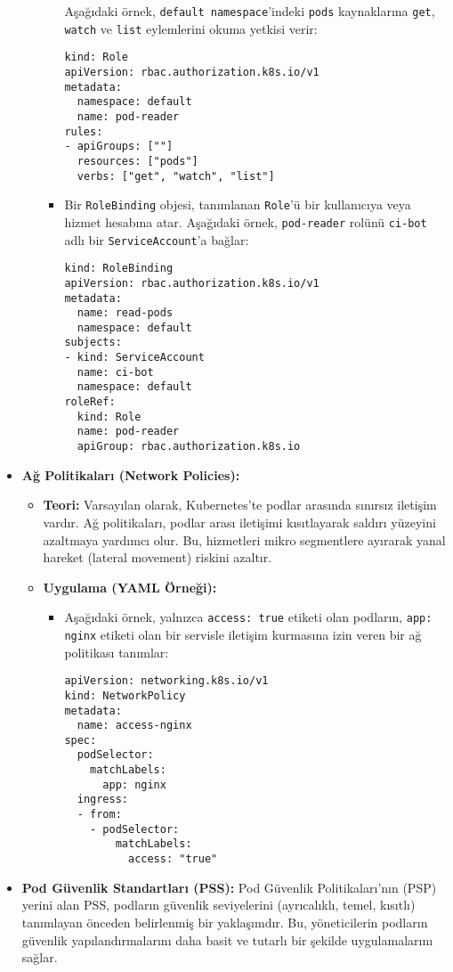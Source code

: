 \begin{itemize}
\begin{itemize}
\begin{itemize}
                Aşağıdaki örnek, \texttt{default namespace}'indeki \texttt{pods} kaynaklarına \texttt{get}, \texttt{watch} ve \texttt{list} eylemlerini okuma yetkisi verir:
\begin{verbatim}
kind: Role
apiVersion: rbac.authorization.k8s.io/v1
metadata:
  namespace: default
  name: pod-reader
rules:
- apiGroups: [""]
  resources: ["pods"]
  verbs: ["get", "watch", "list"]
\end{verbatim}
                \item Bir \texttt{RoleBinding} objesi, tanımlanan \texttt{Role}'ü bir kullanıcıya veya hizmet hesabına atar. Aşağıdaki örnek, \texttt{pod-reader} rolünü \texttt{ci-bot} adlı bir \texttt{ServiceAccount}'a bağlar:
\begin{verbatim}
kind: RoleBinding
apiVersion: rbac.authorization.k8s.io/v1
metadata:
  name: read-pods
  namespace: default
subjects:
- kind: ServiceAccount
  name: ci-bot
  namespace: default
roleRef:
  kind: Role
  name: pod-reader
  apiGroup: rbac.authorization.k8s.io
\end{verbatim}
            \end{itemize}
    \end{itemize}
    \item \textbf{Ağ Politikaları (Network Policies):}
    \begin{itemize}
        \item \textbf{Teori:} Varsayılan olarak, Kubernetes'te podlar arasında sınırsız iletişim vardır. Ağ politikaları, podlar arası iletişimi kısıtlayarak saldırı yüzeyini azaltmaya yardımcı olur. Bu, hizmetleri mikro segmentlere ayırarak yanal hareket (lateral movement) riskini azaltır.
        \item \textbf{Uygulama (YAML Örneği):}
            \begin{itemize}
                \item Aşağıdaki örnek, yalnızca \texttt{access: true} etiketi olan podların, \texttt{app: nginx} etiketi olan bir servisle iletişim kurmasına izin veren bir ağ politikası tanımlar:
\begin{verbatim}
apiVersion: networking.k8s.io/v1
kind: NetworkPolicy
metadata:
  name: access-nginx
spec:
  podSelector:
    matchLabels:
      app: nginx
  ingress:
  - from:
    - podSelector:
        matchLabels:
          access: "true"
\end{verbatim}
            \end{itemize}
    \end{itemize}
    \item \textbf{Pod Güvenlik Standartları (PSS):} Pod Güvenlik Politikaları'nın (PSP) yerini alan PSS, podların güvenlik seviyelerini (ayrıcalıklı, temel, kısıtlı) tanımlayan önceden belirlenmiş bir yaklaşımdır. Bu, yöneticilerin podların güvenlik yapılandırmalarını daha basit ve tutarlı bir şekilde uygulamalarını sağlar.
\end{itemize}

